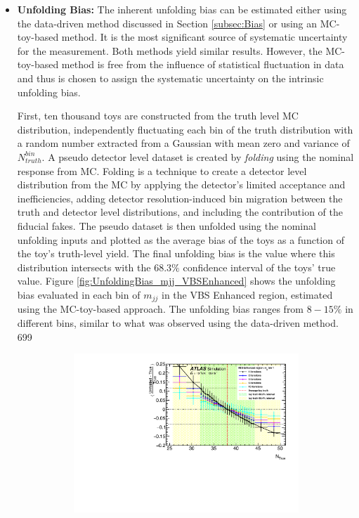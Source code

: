 \begin{itemize}
    \item{\textbf{Unfolding Bias:} The inherent unfolding bias can be estimated either using the data-driven method discussed in Section \ref{subsec:Bias} or using an MC-toy-based method. It is the most significant source of systematic uncertainty for the measurement. Both methods yield similar results. However, the MC-toy-based method is free from the influence of statistical fluctuation in data and thus is chosen to assign the systematic uncertainty on the intrinsic unfolding bias. 

    First, ten thousand toys are constructed from the truth level MC distribution, independently fluctuating each bin of the truth distribution with a random number extracted from a Gaussian with mean zero and variance of $N_{truth}^{bin}$. A pseudo detector level dataset is created by \textit{folding} using the nominal response from MC. Folding is a technique to create a detector level distribution from the MC by applying the detector's limited acceptance and inefficiencies, adding detector resolution-induced bin migration between the truth and detector level distributions, and including the contribution of the fiducial fakes. The pseudo dataset is then unfolded using the nominal unfolding inputs and plotted as the average bias of the toys as a function of the toy's truth-level yield. The final unfolding bias is the value where this distribution intersects with the $68.3\%$ confidence interval of the toys' true value. Figure \ref{fig:UnfoldingBias_mjj_VBSEnhanced} shows the unfolding bias evaluated in each bin of $m_{jj}$ in the VBS Enhanced region, estimated using the MC-toy-based approach. The unfolding bias ranges from $8-15\%$ in different bins, similar to what was observed using the data-driven method. 
699
    \begin{figure}[htb]
        \centering
        \begin{subfigure}{.48\textwidth}
            \centering
            \includegraphics[width=.9\linewidth]{figures/Analysis/Unfolding/unfoldingbias/unfolding_bias_mjj_VBSEnh_bin1.pdf}

\end{subfigure}
\end{figure}}
\end{itemize}
